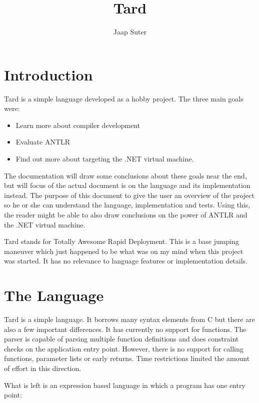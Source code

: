 \documentclass{report}
\begin{document}
\title{Tard}
\author{Jaap Suter}
\maketitle

\tableofcontents

\chapter{Introduction}

Tard is a simple language developed as a hobby project. The three main goals were:

\begin{itemize}
    \item Learn more about compiler development
    \item Evaluate ANTLR
    \item Find out more about targeting the .NET virtual machine.
\end{itemize}

The documentation will draw some conclusions about these goals near
the end, but will focus of the actual document is on the language
and its implementation instead. The purpose of this document to give
the user an overview of the project so he or she can understand the
language, implementation and tests. Using this, the reader might be
able to also draw conclusions on the power of ANTLR and the .NET
virtual machine.

Tard stands for Totally Awesome Rapid Deployment. This is a base jumping maneuver which just
happened to be what was on my mind when this project was started. It has no relevance to language
features or implementation details.

\chapter{The Language}

Tard is a simple language. It borrows many syntax elements from C but there are also
a few important differences. It has currently no support for functions. The parser is capable
of parsing multiple function definitions and does constraint checks on the application entry point. However,
there is no support for calling functions, parameter lists or early returns. Time restrictions limited
the amount of effort in this direction.

What is left is an expression based language in which a program has one entry point:
\end{document}
